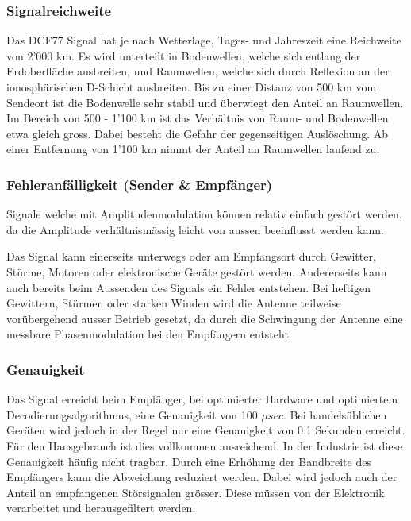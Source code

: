 \paragraph{}

\subsubsection{Signalreichweite}
Das DCF77 Signal hat je nach Wetterlage, Tages- und Jahreszeit eine Reichweite von 2'000 km. Es wird unterteilt in Bodenwellen, welche sich entlang der Erdoberfläche ausbreiten, und Raumwellen, welche sich durch Reflexion an der ionosphärischen D-Schicht ausbreiten. Bis zu einer Distanz von 500 km vom Sendeort ist die Bodenwelle sehr stabil und überwiegt den Anteil an Raumwellen. Im Bereich von 500 - 1'100 km ist das Verhältnis von Raum- und Bodenwellen etwa gleich gross. Dabei besteht die Gefahr der gegenseitigen Auslöschung. Ab einer Entfernung von 1'100 km nimmt der Anteil an Raumwellen laufend zu.

\subsubsection{Fehleranfälligkeit (Sender \& Empfänger)}
Signale welche mit Amplitudenmodulation können relativ einfach gestört werden, da die Amplitude verhältnismässig leicht von aussen beeinflusst werden kann.

Das Signal kann einerseits unterwegs oder am Empfangsort durch Gewitter, Stürme, Motoren oder elektronische Geräte gestört werden. Andererseits kann auch bereits beim Aussenden des Signals ein Fehler entstehen. Bei heftigen Gewittern, Stürmen oder starken Winden wird die Antenne teilweise vorübergehend ausser Betrieb gesetzt, da durch die Schwingung der Antenne eine messbare Phasenmodulation bei den Empfängern entsteht.

\subsubsection{Genauigkeit}
Das Signal erreicht beim Empfänger, bei optimierter Hardware und optimiertem Decodierungsalgorithmus, eine Genauigkeit von 100 ${\mu}sec$. Bei handelsüblichen Geräten wird jedoch in der Regel nur eine Genauigkeit von 0.1 Sekunden erreicht. Für den Hausgebrauch ist dies vollkommen ausreichend.
In der Industrie ist diese Genauigkeit häufig nicht tragbar.
Durch eine Erhöhung der Bandbreite des Empfängers kann die Abweichung reduziert werden. Dabei wird jedoch auch der Anteil an empfangenen Störsignalen grösser. Diese müssen von der Elektronik verarbeitet und herausgefiltert werden.

